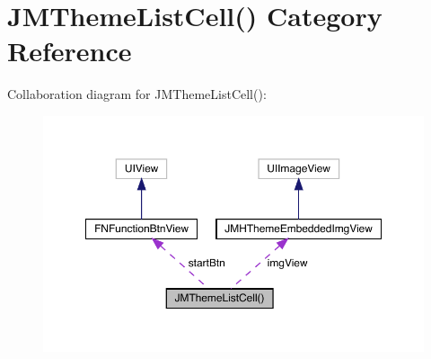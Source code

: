 \hypertarget{category_j_m_theme_list_cell_07_08}{}\section{J\+M\+Theme\+List\+Cell() Category Reference}
\label{category_j_m_theme_list_cell_07_08}


Collaboration diagram for J\+M\+Theme\+List\+Cell()\+:\nopagebreak
\begin{figure}[H]
\begin{center}
\leavevmode
\includegraphics[width=350pt]{category_j_m_theme_list_cell_07_08__coll__graph}
\end{center}
\end{figure}
